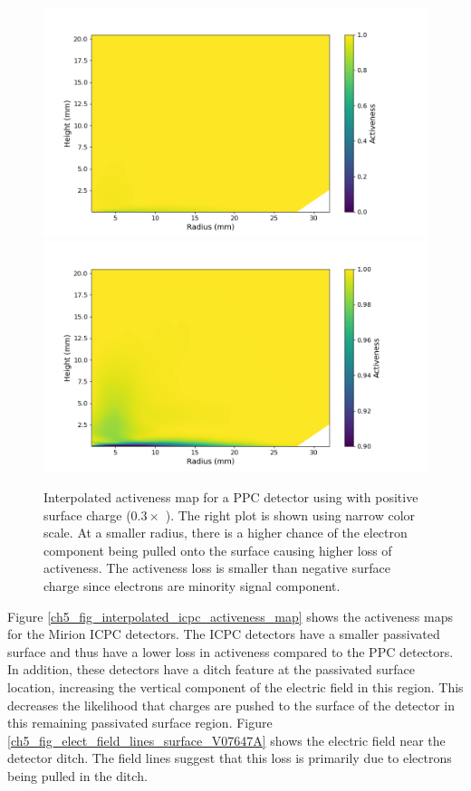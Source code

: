 \begin{figure}%
\centering
\includegraphics[trim={1cm 0cm 3.0cm 1cm},clip,width=0.49\linewidth]{ch5/figs/activeness_map_cubic_sc=0.3_ponama_1_5000_linear_full.png}
\includegraphics[trim={1cm 0cm 3.0cm 1cm},clip,width=0.49\linewidth]{ch5/figs/activeness_map_cubic_sc=0.3_ponama_1_5000_linear.png}
\caption{Interpolated activeness map for a PPC detector using \ehd with positive surface charge ($0.3 \times$ {\scunit}). The right plot is shown using narrow color scale. At a smaller radius, there is a higher chance of the electron component being pulled onto the surface causing higher loss of activeness. The activeness loss is smaller than negative surface charge since electrons are minority signal component.}
\label{ch5_fig_interpolated_activeness_map_pos}
\end{figure}

Figure \ref{ch5_fig_interpolated_icpc_activeness_map} shows the activeness maps for the Mirion ICPC detectors. The ICPC detectors have a smaller passivated surface and thus have a lower loss in activeness compared to the PPC detectors.  In addition, these detectors have a ditch feature at the passivated surface location, increasing the vertical component of the electric field in this region. This decreases the likelihood that charges are pushed to the surface of the detector in this remaining passivated surface region. Figure \ref{ch5_fig_elect_field_lines_surface_V07647A} shows the electric field near the detector ditch. The field lines suggest that this loss is primarily due to electrons being pulled in the ditch.

